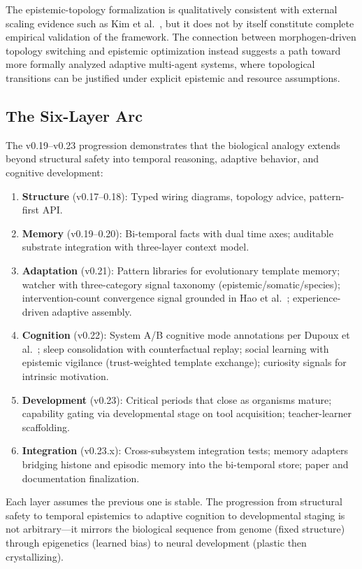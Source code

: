 The epistemic-topology formalization is qualitatively consistent with external scaling evidence such as
Kim et al.~\cite{kim2025scaling}, but it does not by itself constitute complete empirical validation of the
framework. The connection between morphogen-driven topology switching and epistemic optimization instead
suggests a path toward more formally analyzed adaptive multi-agent systems, where topological transitions
can be justified under explicit epistemic and resource assumptions.

\subsection*{The Six-Layer Arc}

The v0.19--v0.23 progression demonstrates that the biological analogy extends beyond structural safety into temporal reasoning, adaptive behavior, and cognitive development:

\begin{enumerate}[leftmargin=*]
\item \textbf{Structure} (v0.17--0.18): Typed wiring diagrams, topology advice, pattern-first API.
\item \textbf{Memory} (v0.19--0.20): Bi-temporal facts with dual time axes; auditable substrate integration with three-layer context model.
\item \textbf{Adaptation} (v0.21): Pattern libraries for evolutionary template memory; watcher with three-category signal taxonomy (epistemic/somatic/species); intervention-count convergence signal grounded in Hao et al.~\cite{hao2026bigmas}; experience-driven adaptive assembly.
\item \textbf{Cognition} (v0.22): System A/B cognitive mode annotations per Dupoux et al.~\cite{dupoux2026learning}; sleep consolidation with counterfactual replay; social learning with epistemic vigilance (trust-weighted template exchange); curiosity signals for intrinsic motivation.
\item \textbf{Development} (v0.23): Critical periods that close as organisms mature; capability gating via developmental stage on tool acquisition; teacher-learner scaffolding.
\item \textbf{Integration} (v0.23.x): Cross-subsystem integration tests; memory adapters bridging histone and episodic memory into the bi-temporal store; paper and documentation finalization.
\end{enumerate}

Each layer assumes the previous one is stable. The progression from structural safety to temporal epistemics to adaptive cognition to developmental staging is not arbitrary---it mirrors the biological sequence from genome (fixed structure) through epigenetics (learned bias) to neural development (plastic then crystallizing).

